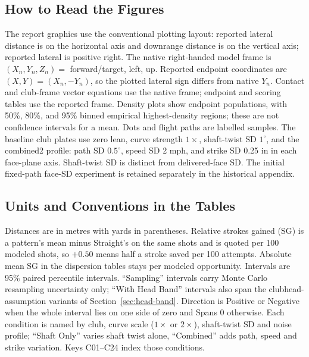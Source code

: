 \documentclass[11pt,letterpaper]{article}
\begin{document}
\subsection{How to Read the Figures}
The report graphics use the conventional plotting layout: reported lateral
distance is on the horizontal axis and downrange distance is on the vertical
axis; reported lateral is positive right. The native right-handed model frame
is $(X_n,Y_n,Z_n)=$ forward/target, left, up. Reported endpoint coordinates are
$(X,Y)=(X_n,-Y_n)$, so the plotted lateral sign differs from native $Y_n$.
Contact and club-frame vector equations use the native frame; endpoint and
scoring tables use the reported frame. Density plots show endpoint
populations, with 50\%, 80\%, and 95\% binned empirical highest-density regions;
these are not confidence intervals for a mean. Dots and flight paths are
labelled samples. The baseline club plates use zero lean, curve strength
$1\times$, shaft-twist SD $1^\circ$, and the combined2 profile: path SD
$0.5^\circ$, speed SD 2 mph, and strike SD 0.25 in in each face-plane axis.
Shaft-twist SD is distinct from delivered-face SD. The initial fixed-path
face-SD experiment is retained separately in the historical appendix.

\subsection{Units and Conventions in the Tables}
Distances are in metres with yards in parentheses. Relative strokes gained
(SG) is a pattern's mean minus Straight's on the same shots and is quoted per
100 modeled shots, so $+0.50$ means half a stroke saved per 100 attempts.
Absolute mean SG in the dispersion tables stays per modeled opportunity.
Intervals are 95\% paired percentile intervals. ``Sampling'' intervals carry
Monte Carlo resampling uncertainty only; ``With Head Band'' intervals also
span the clubhead-assumption variants of
Section~\ref{sec:head-band}. Direction is Positive or Negative when the whole
interval lies on one side of zero and Spans 0 otherwise. Each condition is
named by club, curve scale ($1\times$ or $2\times$), shaft-twist SD and noise
profile; ``Shaft Only'' varies shaft twist alone, ``Combined'' adds path,
speed and strike variation. Keys C01--C24 index those conditions.
\end{document}
